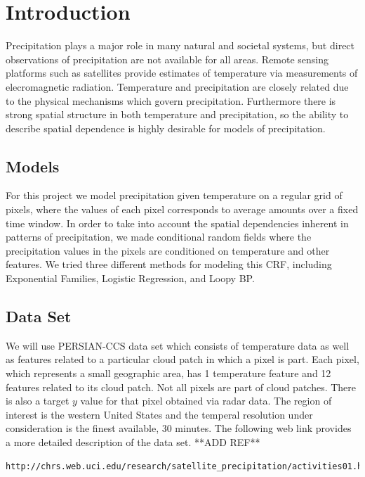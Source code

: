 
\section{Introduction}
Precipitation plays a major role in many natural and societal systems, but direct observations of precipitation are not available for all areas. Remote sensing platforms such as satellites provide estimates of temperature via measurements of elecromagnetic radiation. Temperature and precipitation are closely related due to the physical mechanisms which govern precipitation. Furthermore there is strong spatial structure in both temperature and precipitation, so the ability to describe spatial dependence is highly desirable for models of precipitation. 

\subsection{Models}

For this project we model precipitation given temperature on a regular grid of pixels, where the values of each pixel corresponds to average amounts over a fixed time window. In order to take into account the spatial dependencies inherent in patterns of precipitation, we made conditional random fields where the precipitation values in the pixels are conditioned on temperature and other features. We tried three different methods for modeling this CRF, including Exponential Families, Logistic Regression, and Loopy BP. 

\subsection{Data Set}
We will use PERSIAN-CCS data set which consists of temperature data as well as features related to a particular cloud patch in which a pixel is part. Each pixel, which represents a small geographic area, has 1 temperature feature and 12 features related to its cloud patch. Not all pixels are part of cloud patches. There is also a target $y$ value for that pixel obtained via radar data. The region of interest is the western United States and the temperal resolution under consideration is the finest available, 30 minutes. The following web link provides a more detailed description of the data set. **ADD REF**

\begin{lstlisting}
http://chrs.web.uci.edu/research/satellite_precipitation/activities01.html
\end{lstlisting}

